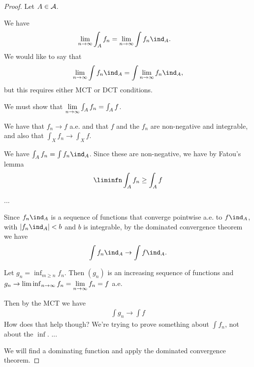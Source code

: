 \begin{proof}
  Let $A \in \mathcal A$.

  We have
  \begin{align*}
    \limn \int_A f_n
    &= \limn \int f_n\ind_A.
  \end{align*}
  We would like to say that
  \begin{align*}
    \limn \int f_n\ind_A = \int \limn f_n\ind_A,
  \end{align*}
  but this requires either MCT or DCT conditions.

  We must show that $\limn \int_A f_n = \int_A f$.

  We have that $f_n \to f$ a.e. and that $f$ and the $f_n$ are non-negative and integrable, and also
  that $\int_X f_n \to \int_X f$.

  We have $\int_A f_n= \int f_n \ind_A$. Since these are non-negative, we have by Fatou's lemma
  \begin{align*}
    \liminfn \int_A f_n \geq \int_A f
  \end{align*}



  ...


  Since $f_n\ind_{A}$ is a sequence of functions that converge pointwise a.e. to $f\ind_A$,
  with $|f_n\ind_A| < b$ and $b$ is integrable, by the dominated convergence theorem we have
  \begin{align*}
    \int f_n\ind_A \to \int f\ind_A.
  \end{align*}




  Let $g_n = \inf_{m \geq n} f_n$. Then $(g_n)$ is an increasing sequence of functions
  and $g_n \to \liminf_{n \to \infty} f_n = \limn f_n = f$ a.e.

  Then by the MCT we have
  \begin{align*}
    \int g_n \to \int f
  \end{align*}
  How does that help though? We're trying to prove something about $\int f_n$, not about the $\inf$.
  ...








  We will find a dominating function and apply the dominated convergence theorem.






\end{proof}

